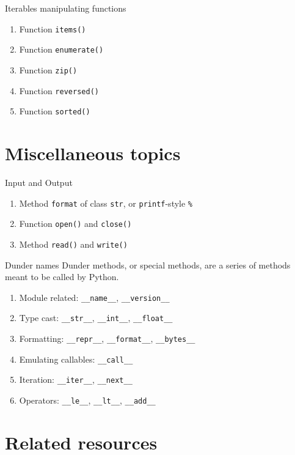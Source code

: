 \documentclass[english, nochinese]{pkuslide}
\begin{document}
\begin{frame}[fragile]{Iterables manipulating functions}
\begin{enumerate}
\item Function \verb"items()"
\item Function \verb"enumerate()"
\item Function \verb"zip()"
\item Function \verb"reversed()"
\item Function \verb"sorted()"
\end{enumerate}
\end{frame}

\section{Miscellaneous topics}

\begin{frame}
\sectionpage
\end{frame}

\begin{frame}[fragile]{Input and Output}
\begin{enumerate}
\item Method \verb"format" of class \verb"str", or \verb"printf"-style \verb"%"
\item Function \verb"open()" and \verb"close()"
\item Method \verb"read()" and \verb"write()"
\end{enumerate}
\end{frame}

\begin{frame}[fragile]{Dunder names}
Dunder methods, or special methods, are a series of methods meant to be called by Python.
\begin{enumerate}
\item Module related: \verb"__name__", \verb"__version__"
\item Type cast: \verb"__str__", \verb"__int__", \verb"__float__"
\item Formatting: \verb"__repr__", \verb"__format__", \verb"__bytes__"
\item Emulating callables: \verb"__call__"
\item Iteration: \verb"__iter__", \verb"__next__"
\item Operators: \verb"__le__", \verb"__lt__", \verb"__add__"
\end{enumerate}
\end{frame}

\section{Related resources}
\end{document}
